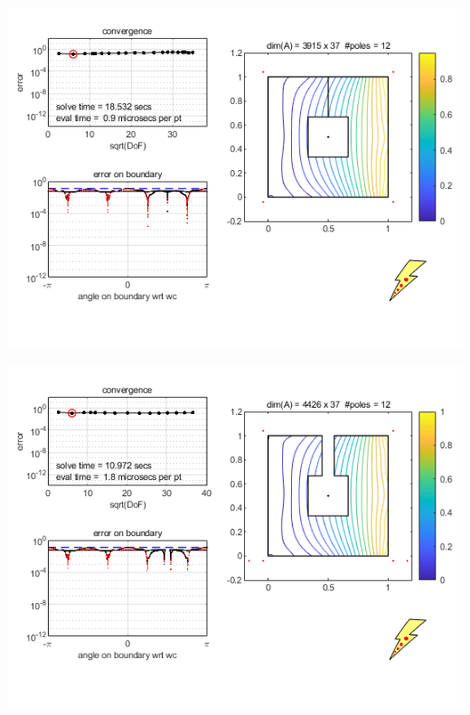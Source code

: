 \documentclass{seminar}
\begin{document}
\begin{slide} %
\begin{center}
\includegraphics[scale=0.7]{./PNG/square-ception}
\end{center}
\end{slide}
\begin{slide}
\begin{center}
\includegraphics[scale=0.7]{./PNG/square-ception_reckoning}
\end{center}
\end{slide} %
\end{document}
